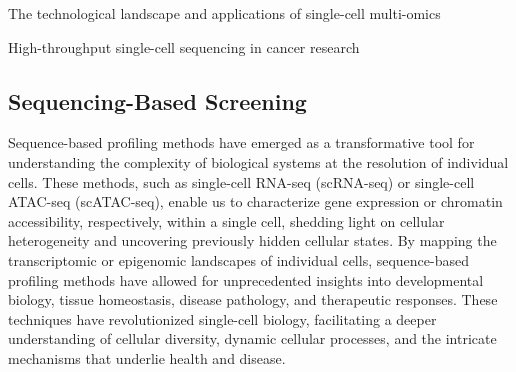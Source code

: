 
The technological landscape and applications of single-cell multi-omics \citep{baysoy2023technological}

High-throughput single-cell sequencing in cancer research \citep{jia2022high}

\subsection{Sequencing-Based Screening}

Sequence-based profiling methods have emerged as a transformative tool for understanding the complexity of biological systems at the resolution of individual cells. These methods, such as single-cell \acrlong{RNA-seq} (scRNA-seq) or single-cell \acrlong{ATAC-seq} (scATAC-seq), enable us to characterize gene expression or chromatin accessibility, respectively, within a single cell, shedding light on cellular heterogeneity and uncovering previously hidden cellular states.
By mapping the transcriptomic or epigenomic landscapes of individual cells, sequence-based profiling methods have allowed for unprecedented insights into developmental biology, tissue homeostasis, disease pathology, and therapeutic responses. These techniques have revolutionized single-cell biology, facilitating a deeper understanding of cellular diversity, dynamic cellular processes, and the intricate mechanisms that underlie health and disease.

